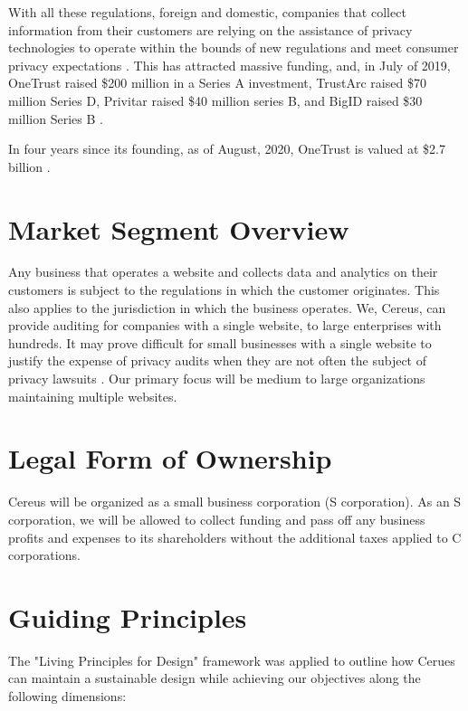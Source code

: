 With all these regulations, foreign and domestic, companies that collect information from their customers are relying on the assistance of privacy technologies to operate within the bounds of new regulations and meet consumer privacy expectations \cite{meehan.forbes.2019}. This has attracted massive funding, and, in July of 2019, OneTrust raised \$200 million in a Series A investment, TrustArc raised \$70 million Series D, Privitar raised \$40 million series B, and BigID raised \$30 million Series B \cite{wood.fpf.2019}.

In four years since its founding, as of August, 2020, OneTrust is valued at \$2.7 billion \cite{hughes.iapp.2020}.

\section{Market Segment Overview}

Any business that operates a website and collects data and analytics on their customers is subject to the regulations in which the customer originates. This also applies to the jurisdiction in which the business operates. We, Cereus, can provide auditing for companies with a single website, to large enterprises with hundreds. It may prove difficult for small businesses with a single website to justify the expense of privacy audits when they are not often the subject of privacy lawsuits \cite{lanou.2020}. Our primary focus will be medium to large organizations maintaining multiple websites. 

\section{Legal Form of Ownership} \label{legal.ownership}

Cereus will be organized as a small business corporation (S corporation). As an S corporation, we will be allowed to collect funding and pass off any business profits and expenses to its shareholders without the additional taxes applied to C corporations.

\section{Guiding Principles} \label{guiding.principles}

The "Living Principles for Design" framework \cite{brink.aiga.2020} was applied to outline how Cerues can maintain a sustainable design while achieving our objectives along the following dimensions:

